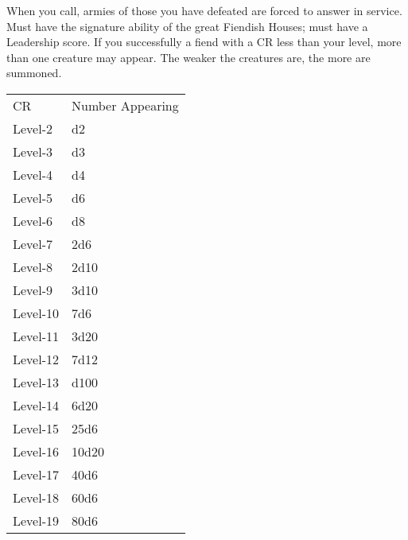  {}
\descfeat
{When you call, armies of those you have defeated are forced to answer in service.}
{Must have the signature  ability of the great Fiendish Houses; must have a Leadership score.}
{If you successfully  a fiend with a CR less than your level, more than one creature may appear. The weaker the creatures are, the more are summoned.}

	\begin{small}
	\begin{tabular}{ll}
	CR  &Number Appearing\\
	Level-2   &d2\\
	Level-3   &d3\\
	Level-4   &d4\\
	Level-5   &d6\\
	Level-6   &d8\\
	Level-7   &2d6\\
	Level-8   &2d10\\
	Level-9   &3d10\\
	Level-10  &7d6\\
	Level-11  &3d20\\
	Level-12  &7d12\\
	Level-13  &d100\\
	Level-14  &6d20\\
	Level-15  &25d6\\
	Level-16  &10d20\\
	Level-17  &40d6\\
	Level-18  &60d6\\
	Level-19  &80d6\\
	\end{tabular}
	\end{small}